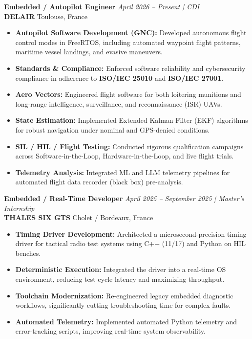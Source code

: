 \documentclass[10pt,a4paper]{article}
\begin{document}
\textbf{Embedded / Autopilot Engineer} \hfill \textit{April 2026 -- Present | CDI}\\
\textbf{\color{accent}DELAIR} \hfill Toulouse, France
\vspace{2pt}
\begin{itemize}
    \item \textbf{Autopilot Software Development (GNC):} Developed autonomous flight control modes in FreeRTOS, including automated waypoint flight patterns, maritime vessel landings, and evasive maneuvers.
    \item \textbf{Standards \& Compliance:} Enforced software reliability and cybersecurity compliance in adherence to \textbf{ISO/IEC 25010} and \textbf{ISO/IEC 27001}.
    \item \textbf{Aero Vectors:} Engineered flight software for both loitering munitions and long-range intelligence, surveillance, and reconnaissance (ISR) UAVs.
    \item \textbf{State Estimation:} Implemented Extended Kalman Filter (EKF) algorithms for robust navigation under nominal and GPS-denied conditions.
    \item \textbf{SIL / HIL / Flight Testing:} Conducted rigorous qualification campaigns across Software-in-the-Loop, Hardware-in-the-Loop, and live flight trials.
    \item \textbf{Telemetry Analysis:} Integrated ML and LLM telemetry pipelines for automated flight data recorder (black box) pre-analysis.
\end{itemize}

\vspace{4pt}
\textbf{Embedded / Real-Time Developer} \hfill \textit{April 2025 -- September 2025 | Master's Internship}\\
\textbf{\color{accent}THALES SIX GTS} \hfill Cholet / Bordeaux, France
\vspace{2pt}
\begin{itemize}
    \item \textbf{Timing Driver Development:} Architected a microsecond-precision timing driver for tactical radio test systems using C++ (11/17) and Python on HIL benches.
    \item \textbf{Deterministic Execution:} Integrated the driver into a real-time OS environment, reducing test cycle latency and maximizing throughput.
    \item \textbf{Toolchain Modernization:} Re-engineered legacy embedded diagnostic workflows, significantly cutting troubleshooting time for complex faults.
    \item \textbf{Automated Telemetry:} Implemented automated Python telemetry and error-tracking scripts, improving real-time system observability.
\end{itemize}
\end{document}
